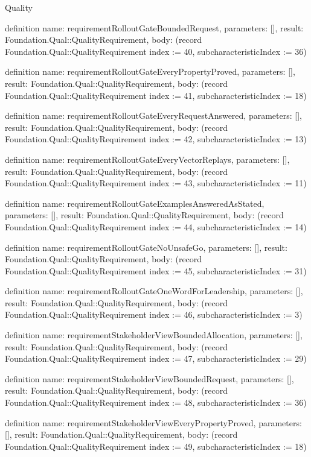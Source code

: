 \begin{lexlean}{Quality}
\begin{semanticmodule}
definition{
  name: requirementRolloutGateBoundedRequest,
  parameters: [],
  result: Foundation.Qual::QualityRequirement,
  body: (record Foundation.Qual::QualityRequirement {index := 40, subcharacteristicIndex := 36})
}

definition{
  name: requirementRolloutGateEveryPropertyProved,
  parameters: [],
  result: Foundation.Qual::QualityRequirement,
  body: (record Foundation.Qual::QualityRequirement {index := 41, subcharacteristicIndex := 18})
}

definition{
  name: requirementRolloutGateEveryRequestAnswered,
  parameters: [],
  result: Foundation.Qual::QualityRequirement,
  body: (record Foundation.Qual::QualityRequirement {index := 42, subcharacteristicIndex := 13})
}

definition{
  name: requirementRolloutGateEveryVectorReplays,
  parameters: [],
  result: Foundation.Qual::QualityRequirement,
  body: (record Foundation.Qual::QualityRequirement {index := 43, subcharacteristicIndex := 11})
}

definition{
  name: requirementRolloutGateExamplesAnsweredAsStated,
  parameters: [],
  result: Foundation.Qual::QualityRequirement,
  body: (record Foundation.Qual::QualityRequirement {index := 44, subcharacteristicIndex := 14})
}

definition{
  name: requirementRolloutGateNoUnsafeGo,
  parameters: [],
  result: Foundation.Qual::QualityRequirement,
  body: (record Foundation.Qual::QualityRequirement {index := 45, subcharacteristicIndex := 31})
}

definition{
  name: requirementRolloutGateOneWordForLeadership,
  parameters: [],
  result: Foundation.Qual::QualityRequirement,
  body: (record Foundation.Qual::QualityRequirement {index := 46, subcharacteristicIndex := 3})
}

definition{
  name: requirementStakeholderViewBoundedAllocation,
  parameters: [],
  result: Foundation.Qual::QualityRequirement,
  body: (record Foundation.Qual::QualityRequirement {index := 47, subcharacteristicIndex := 29})
}

definition{
  name: requirementStakeholderViewBoundedRequest,
  parameters: [],
  result: Foundation.Qual::QualityRequirement,
  body: (record Foundation.Qual::QualityRequirement {index := 48, subcharacteristicIndex := 36})
}

definition{
  name: requirementStakeholderViewEveryPropertyProved,
  parameters: [],
  result: Foundation.Qual::QualityRequirement,
  body: (record Foundation.Qual::QualityRequirement {index := 49, subcharacteristicIndex := 18})
}


\end{semanticmodule}
\end{lexlean}
